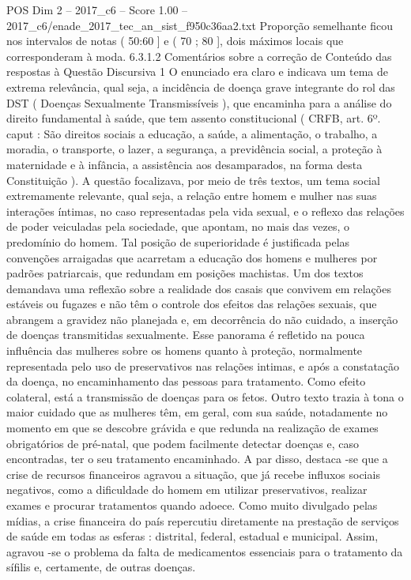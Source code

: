 \begin{textsample}{POS Dim 2 – 2017\_c6 – Score 1.00 – 2017\_c6/enade\_2017\_tec\_an\_sist\_f950c36aa2.txt}
Proporção semelhante ficou nos intervalos de notas ( 50:60 ] e ( 70 ; 80 ], dois máximos locais que corresponderam à moda. 6.3.1.2 Comentários sobre a correção de Conteúdo das respostas à Questão Discursiva 1 O enunciado era claro e indicava um tema de extrema relevância, qual seja, a incidência de doença grave integrante do rol das DST ( Doenças Sexualmente Transmissíveis ), que encaminha para a análise do direito fundamental à saúde, que tem assento constitucional ( CRFB, art. 6º. caput : São direitos sociais a educação, a saúde, a alimentação, o trabalho, a moradia, o transporte, o lazer, a segurança, a previdência social, a proteção à maternidade e à infância, a assistência aos desamparados, na forma desta Constituição ).
A questão focalizava, por meio de três textos, um tema social extremamente relevante, qual seja, a relação entre homem e mulher nas suas interações íntimas, no caso representadas pela vida sexual, e o reflexo das relações de poder veiculadas pela sociedade, que apontam, no mais das vezes, o predomínio do homem.
Tal posição de superioridade é justificada pelas convenções arraigadas que acarretam a educação dos homens e mulheres por padrões patriarcais, que redundam em posições machistas.
Um dos textos demandava uma reflexão sobre a realidade dos casais que convivem em relações estáveis ou fugazes e não têm o controle dos efeitos das relações sexuais, que abrangem a gravidez não planejada e, em decorrência do não cuidado, a inserção de doenças transmitidas sexualmente.
Esse panorama é refletido na pouca influência das mulheres sobre os homens quanto à proteção, normalmente representada pelo uso de preservativos nas relações intimas, e após a constatação da doença, no encaminhamento das pessoas para tratamento.
Como efeito colateral, está a transmissão de doenças para os fetos.
Outro texto trazia à tona o maior cuidado que as mulheres têm, em geral, com sua saúde, notadamente no momento em que se descobre grávida e que redunda na realização de exames obrigatórios de pré-natal, que podem facilmente detectar doenças e, caso encontradas, ter o seu tratamento encaminhado.
A par disso, destaca -se que a crise de recursos financeiros agravou a situação, que já recebe influxos sociais negativos, como a dificuldade do homem em utilizar preservativos, realizar exames e procurar tratamentos quando adoece.
Como muito divulgado pelas mídias, a crise financeira do país repercutiu diretamente na prestação de serviços de saúde em todas as esferas : distrital, federal, estadual e municipal.
Assim, agravou -se o problema da falta de medicamentos essenciais para o tratamento da sífilis e, certamente, de outras doenças.

\end{textsample}
